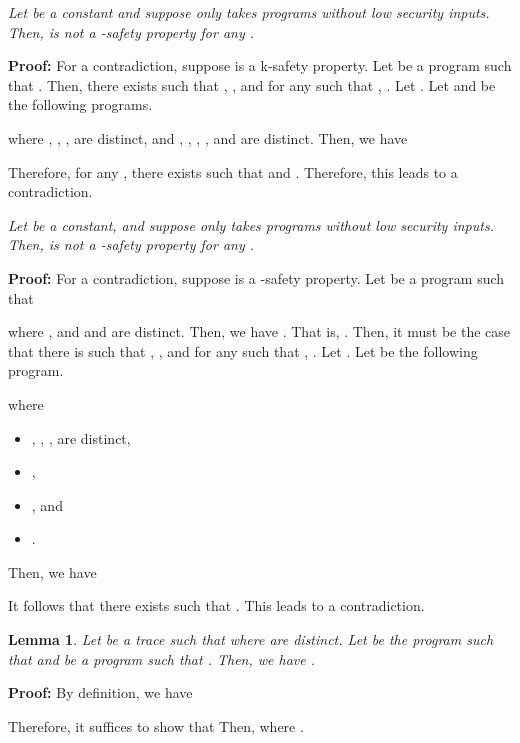 \documentclass{llncs}
\newtheorem{lemma}[theorem]{Lemma}
\newenvironment{proof}{\noindent\rm{\bf Proof:}}{\hbox{}\vspace*{0.2\baselineskip}}
\newenvironment{reftheorem}[1]{\begin{trivlist}\item[\hskip
      \labelsep{\bf Theorem #1.}]\it}{\end{trivlist}}
\begin{document}
\begin{reftheorem}{\ref{thm:senk}}
  Let  be a constant and suppose  only takes
  programs without low security inputs. Then,  is not a
  -safety property for any .
\end{reftheorem}
\begin{proof}
  For a contradiction, suppose  is a k-safety property.
  Let  be a program such that .  Then,
  there exists  such that , , and
  for any  such that , .  Let .  Let 
  and  be the following programs.

where , , ,  are distinct, and , ,
, , and  are distinct.  Then, we have

Therefore, for any , there exists  such that  and .
Therefore, this leads to a contradiction.
\end{proof}

\begin{reftheorem}{\ref{thm:be1nk}}
Let  be a constant, and suppose  only
takes programs without low security inputs.  Then,  is not a -safety property for any .
\end{reftheorem}
\begin{proof}
For a contradiction, suppose  is
a -safety property.  Let  be a program such that 

where , and  and  are
distinct.  Then, we have .  That is, .  Then, it
must be the case that there is  such that ,
, and for any  such that , .
Let .  Let  be the
following program.

where 
\begin{itemize}
\item , , ,  are distinct,
\item ,
\item , and
\item .
\end{itemize}
Then, we have 

It follows that there exists  such that .  This leads to a contradiction.
\end{proof}

\begin{lemma}
\label{lem:bemono}
Let  be a trace such that  where  are distinct.  Let 
be the program such that  and  be a program such
that .  Then, we have .
\end{lemma}
\begin{proof}
  By definition, we have 

Therefore, it suffices to show that 
  Then,
where .
\end{proof}
\end{document}
